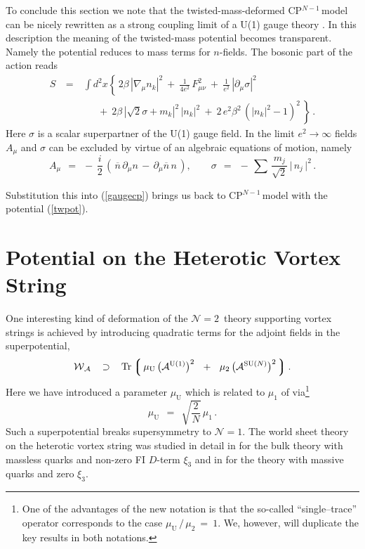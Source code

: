 \documentclass[12pt]{article}
\def\beq{\begin{equation}}
\def\eeq{\end{equation}}
\def\beqn{\begin{eqnarray}}
\def\eeqn{\end{eqnarray}}
\def\beqn{\begin{eqnarray}}
\def\eeqn{\end{eqnarray}}
\newcommand{\nonen}{${\mathcal N}=1$}
\newcommand{\ntwon}{${\mathcal N}=2$}
\newcommand{\pt}{\partial}
\newcommand{\ov}{\overline}
\newcommand{\mc}[1]{\mathcal{#1}}
\newcommand{\mw}{\mathcal{W}}
\newcommand{\ma}{\mathcal{A}}
\newcommand{\lgr}{\left\lgroup}
\newcommand{\rgr}{\right\rgroup}
\newcommand{\AU}{\mc{A}^{\rm U(1)}}
\newcommand{\AN}{\mc{A}^\text{SU($N$)}}
\newcommand{\nbar}{\ov{n}}
\newcommand{\muU}{\mu_\text{U}}
\newcommand{\cpn}{CP$^{N-1}$\,}
\newcommand{\Tr}{\text{Tr}}
\begin{document}
	To conclude this section we note that the twisted-mass-deformed \cpn model can be nicely rewritten as a
	strong coupling limit of a U(1) gauge theory \cite{HaHo}. 
	In this description the meaning of the twisted-mass potential becomes  transparent. 
	Namely the potential  reduces to mass terms for $n$-fields.  
	The bosonic part of the action reads
\beqn
%	
	S 
	& ~=~ &
	\int d^2 x \left\{\,
	 2\beta\,|\nabla_{\mu} n_{k}|^2 ~+~ \frac1{4e^2}\, F^2_{\mu\nu} ~+~ \frac1{e^2}\, |\pt_{\mu}\sigma|^2
	\right.
\nonumber\\[3mm]
%
	&& \quad~ 
	~+~ \left. 2\beta\,| \sqrt{2}\sigma + m_k |^2\, |n_{k}|^2 ~+~
	2\, e^2 \beta^2\, (|n_{k}|^2 -1)^2
	\,\right\}\,.
\label{gaugecp}
\eeqn
	Here $\sigma$ is a scalar superpartner of the U(1) gauge field.
	In the limit $e^2\to \infty$ fields $A_{\mu}$ and $\sigma$  can be excluded by virtue of an algebraic
	equations of motion, namely
\beq
	A_{\mu} ~~=~~ -\, \frac{i}{2}\,\left(\, \nbar\, \pt_{\mu}n \,-\, \pt_{\mu}\nbar \,n \,\right),
\qquad 
	\sigma    ~~=~~    -\, \sum\, \frac{m_j}{\sqrt{2}}\, \big|\, n_j \,\big|^2\,.
\label{Asigma}
\eeq


	Substitution this into (\ref{gaugecp}) brings us back to  \cpn model with the potential (\ref{twpot}).



\section{Potential on the Heterotic Vortex String}
\setcounter{equation}{0}

	One interesting kind of deformation of the \ntwon\, theory supporting vortex strings is
	achieved by introducing quadratic terms for the adjoint fields in the superpotential,
\beq
\label{WA}
	\mw{}_\ma    ~~\:\supset\:~~    \Tr \lgr\, \muU\, \big( \AU \big)^2   ~~+~~  \mu_2\, \big( \AN \big)^2 \,\rgr.
\eeq
	Here we have introduced a parameter $ \muU $ which is related to $ \mu_1 $ of \cite{SY1} via\footnote{
	One of the advantages of the new notation is that the so-called ``single--trace'' operator
	corresponds to the case $ \muU \,/\, \mu_2  ~=~ 1 $.
	We, however, will duplicate the key results in both notations.}
\beq
	\muU    ~~=~~ \sqrt{\frac{2}{N}}\, \mu_1\,.
\eeq
	Such a superpotential breaks supersymmetry to \nonen. 
	The world sheet theory on the heterotic vortex string was studied in detail in \cite{Edalati,SY1,BSY3} 
	for the bulk theory with massless quarks and non-zero FI $D$-term $ \xi_3 $ and in \cite{Shifman:2010kr} for the 
	theory with massive quarks and zero $ \xi_3 $.
\end{document}
